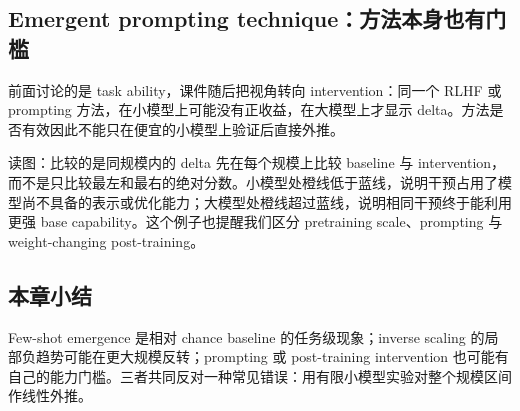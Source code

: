 \subsection{Emergent prompting technique：方法本身也有门槛}

前面讨论的是 task ability，课件随后把视角转向 intervention：同一个 RLHF 或 prompting 方法，在小模型上可能没有正收益，在大模型上才显示 delta。方法是否有效因此不能只在便宜的小模型上验证后直接外推。


\begin{knowledgebox}{读图：比较的是同规模内的 delta}
先在每个规模上比较 baseline 与 intervention，而不是只比较最左和最右的绝对分数。小模型处橙线低于蓝线，说明干预占用了模型尚不具备的表示或优化能力；大模型处橙线超过蓝线，说明相同干预终于能利用更强 base capability。这个例子也提醒我们区分 pretraining scale、prompting 与 weight-changing post-training。
\end{knowledgebox}


\subsection{本章小结}

Few-shot emergence 是相对 chance baseline 的任务级现象；inverse scaling 的局部负趋势可能在更大规模反转；prompting 或 post-training intervention 也可能有自己的能力门槛。三者共同反对一种常见错误：用有限小模型实验对整个规模区间作线性外推。

